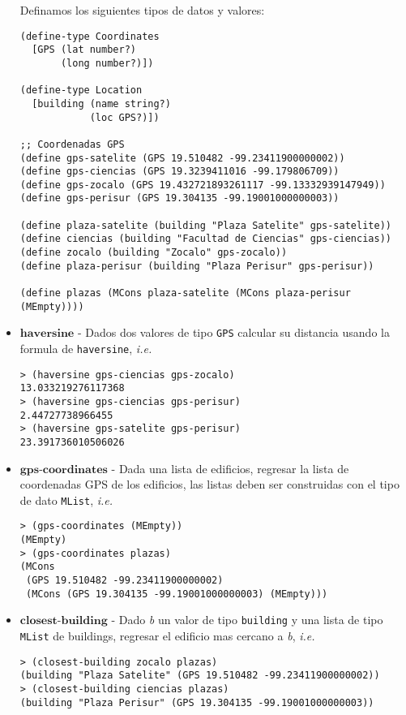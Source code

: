 \documentclass{article}
\begin{document}
\begin{itemize}
Definamos los siguientes tipos de datos y valores:
\begin{verbatim}
(define-type Coordinates
  [GPS (lat number?)
       (long number?)])

(define-type Location
  [building (name string?)
            (loc GPS?)])

;; Coordenadas GPS
(define gps-satelite (GPS 19.510482 -99.23411900000002))
(define gps-ciencias (GPS 19.3239411016 -99.179806709))
(define gps-zocalo (GPS 19.432721893261117 -99.13332939147949))
(define gps-perisur (GPS 19.304135 -99.19001000000003))

(define plaza-satelite (building "Plaza Satelite" gps-satelite))
(define ciencias (building "Facultad de Ciencias" gps-ciencias))
(define zocalo (building "Zocalo" gps-zocalo))
(define plaza-perisur (building "Plaza Perisur" gps-perisur))

(define plazas (MCons plaza-satelite (MCons plaza-perisur (MEmpty))))
\end{verbatim}

\item $\textbf{haversine}$ - Dados dos valores de tipo \texttt{GPS} calcular
  su distancia usando la formula de \texttt{haversine}, \textit{i.e.}
\begin{verbatim}
> (haversine gps-ciencias gps-zocalo)
13.033219276117368
> (haversine gps-ciencias gps-perisur)
2.44727738966455
> (haversine gps-satelite gps-perisur)
23.391736010506026
\end{verbatim}

\newpage

\item $\textbf{gps-coordinates}$ - Dada una lista de edificios, regresar
  la lista de coordenadas GPS de los edificios, las listas deben ser construidas
  con el tipo de dato \texttt{MList}, \textit{i.e.}
\begin{verbatim}
> (gps-coordinates (MEmpty))
(MEmpty)
> (gps-coordinates plazas)
(MCons
 (GPS 19.510482 -99.23411900000002)
 (MCons (GPS 19.304135 -99.19001000000003) (MEmpty)))
\end{verbatim}

\item $\textbf{closest-building}$ - Dado \textit{b} un valor de tipo \texttt{building} y una lista de tipo \texttt{MList} de buildings, regresar el edificio mas cercano a \textit{b}, \textit{i.e.}
\begin{verbatim}
> (closest-building zocalo plazas)
(building "Plaza Satelite" (GPS 19.510482 -99.23411900000002))
> (closest-building ciencias plazas)
(building "Plaza Perisur" (GPS 19.304135 -99.19001000000003))
\end{verbatim}


\end{itemize}
\end{document}
